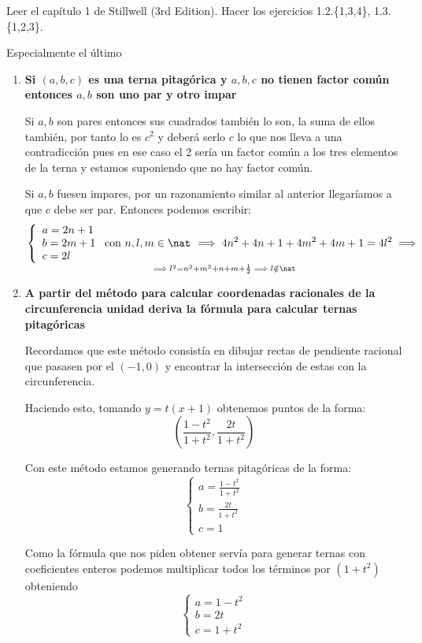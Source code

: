 \begin{problem}[9]
Leer el capítulo 1 de Stillwell (3rd Edition). Hacer los ejercicios 1.2.\{1,3,4\}, 1.3.\{1,2,3\}.

Especialmente el último

\solution


\begin{enumerate}
\item \textbf{Si $(a,b,c)$ es una terna pitagórica y $a,b,c$ no tienen factor común entonces $a,b$ son uno par y otro impar}

Si $a,b$ son pares entonces sus cuadrados también lo son, la suma de ellos también, por tanto lo es $c^2$ y deberá serlo $c$ lo que nos lleva a una contradicción pues en ese caso el 2 sería un factor común a los tres elementos de la terna y estamos suponiendo que no hay factor común.

Si $a,b$ fuesen impares, por un razonamiento similar al anterior llegaríamos a que $c$ debe ser par. Entonces podemos escribir:
\[\left\{\begin{array}{l}
a=2n+1 \\
b=2m+1\\
c=2l
\end{array} \text{ con } n,l,m \in \nat\right. \implies 4n^2+4n+1 +4m^2+4m+1 = 4l^2 \implies \atop \implies l^2=n^2+m^2+n+m+\frac{1}{2} \implies l \notin \nat\]

\item \textbf{A partir del método para calcular coordenadas racionales de la circunferencia unidad deriva la fórmula para calcular ternas pitagóricas}

Recordamos que este método consistía en dibujar rectas de pendiente racional que pasasen por el $(-1,0)$ y encontrar la intersección de estas con la circunferencia.

Haciendo esto, tomando $y=t(x+1)$ obtenemos puntos de la forma:
\[\left(\frac{1-t^2}{1+t^2}, \frac{2t}{1+t^2}\right)\]

Con este método estamos generando ternas pitagóricas de la forma:
\[\left\{\begin{array}{l}
a=\frac{1-t^2}{1+t^2} \\
b=\frac{2t}{1+t^2}\\
c=1
\end{array}\right.\]

Como la fórmula que nos piden obtener servía para generar ternas con coeficientes enteros podemos multiplicar todos los términos por $(1+t^2)$ obteniendo
\[\left\{\begin{array}{l}
a=1-t^2 \\
b=2t\\
c=1+t^2
\end{array}\right.\]


\end{enumerate}
\end{problem}

